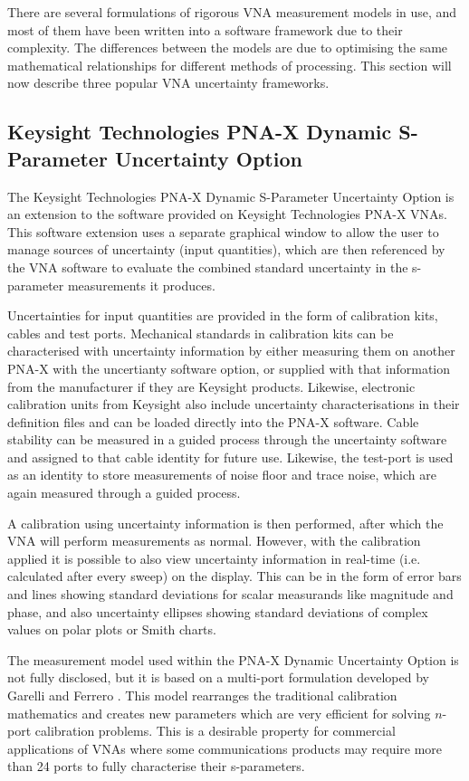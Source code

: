 \documentclass[../thesis/thesis.tex]{subfiles}
\begin{document}
\begin{refsection}
There are several formulations of rigorous VNA measurement models in use, and most of them have been written into a software framework due to their complexity. The differences between the models are due to optimising the same mathematical relationships for different methods of processing. This section will now describe three popular VNA uncertainty frameworks.

\subsection{Keysight Technologies PNA-X Dynamic S-Parameter Uncertainty Option}

The Keysight Technologies PNA-X Dynamic S-Parameter Uncertainty Option is an extension to the software provided on Keysight Technologies PNA-X VNAs. This software extension uses a separate graphical window to allow the user to manage sources of uncertainty (input quantities), which are then referenced by the VNA software to evaluate the combined standard uncertainty in the s-parameter measurements it produces.

Uncertainties for input quantities are provided in the form of calibration kits, cables and test ports. Mechanical standards in calibration kits can be characterised with uncertainty information by either measuring them on another PNA-X with the uncertianty software option, or supplied with that information from the manufacturer if they are Keysight products. Likewise, electronic calibration units from Keysight also include uncertainty characterisations in their definition files and can be loaded directly into the PNA-X software. Cable stability can be measured in a guided process through the uncertainty software and assigned to that cable identity for future use. Likewise, the test-port is used as an identity to store measurements of noise floor and trace noise, which are again measured through a guided process.

A calibration using uncertainty information is then performed, after which the VNA will perform measurements as normal. However, with the calibration applied it is possible to also view uncertainty information in real-time (i.e. calculated after every sweep) on the display. This can be in the form of error bars and lines showing standard deviations for scalar measurands like magnitude and phase, and also uncertainty ellipses showing standard deviations of complex values on polar plots or Smith charts.

The measurement model used within the PNA-X Dynamic Uncertainty Option is not fully disclosed, but it is based on a multi-port formulation developed by Garelli and Ferrero \cite{Garelli_2012}. This model rearranges the traditional calibration mathematics and creates new parameters which are very efficient for solving $n$-port calibration problems. This is a desirable property for commercial applications of VNAs where some communications products may require more than 24 ports to fully characterise their s-parameters.


\end{refsection}
\end{document}

